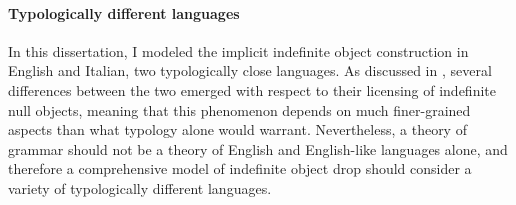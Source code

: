 

\paragraph{Typologically different languages}
In this dissertation, I modeled the implicit indefinite object construction in English and Italian, two typologically close languages. As discussed in , several differences between the two emerged with respect to their licensing of indefinite null objects, meaning that this phenomenon depends on much finer-grained aspects than what typology alone would warrant. Nevertheless, a theory of grammar should not be a theory of English and English-like languages alone, and therefore a comprehensive model of indefinite object drop should consider a variety of typologically different languages.\\
